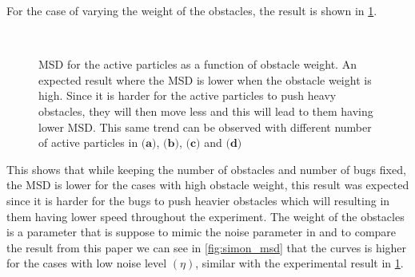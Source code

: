 For the case of varying the weight of the obstacles, the result is shown in \cref{fig:msd_NW}.



\begin{figure}[htbp]
\centering
\\
\caption{MSD for the active particles as a function of obstacle weight. An 
expected result where the MSD is lower when the obstacle weight is high. Since 
it is harder for the active particles to push heavy obstacles, they will then 
move less and this will lead to them having lower MSD. This same trend can be observed 
with different number of active particles in $\textbf{(a)}$, $\textbf{(b)}$, $\textbf{(c)}$ and $\textbf{(d)}$} 
\label{fig:msd_NW}
\end{figure}

This shows that while keeping the number of obstacles and number of bugs fixed, the 
MSD is lower for the cases with high obstacle weight, this result was expected 
since it is harder for the bugs to push heavier obstacles which will resulting in them 
having lower speed throughout the experiment. The weight of the obstacles is a parameter that is suppose to 
mimic the noise parameter in \cite{nilsson2017metastable} and to compare the result 
from this paper we can see in \cref{fig:simon_msd} that the curves is higher for the 
cases with low noise level $(\eta)$, similar with the experimental result in \cref{fig:msd_NW}.

